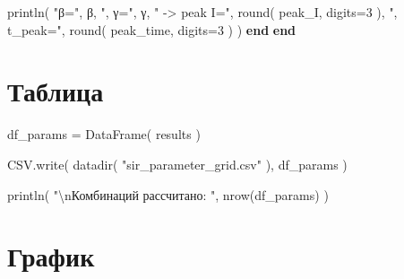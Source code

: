 \documentclass[
  english,
  russian,
  12pt,
  a4paper,
  DIV=11,
  numbers=noendperiod]{scrreprt}
\newenvironment{Shaded}{\begin{snugshade}}{\end{snugshade}}
\newcommand{\ControlFlowTok}[1]{\textcolor[rgb]{0.00,0.23,0.31}{\textbf{#1}}}
\newcommand{\FloatTok}[1]{\textcolor[rgb]{0.68,0.00,0.00}{#1}}
\newcommand{\FunctionTok}[1]{\textcolor[rgb]{0.28,0.35,0.67}{#1}}
\newcommand{\NormalTok}[1]{\textcolor[rgb]{0.00,0.23,0.31}{#1}}
\newcommand{\OperatorTok}[1]{\textcolor[rgb]{0.37,0.37,0.37}{#1}}
\newcommand{\SpecialCharTok}[1]{\textcolor[rgb]{0.37,0.37,0.37}{#1}}
\newcommand{\StringTok}[1]{\textcolor[rgb]{0.13,0.47,0.30}{#1}}
\begin{document}
\begin{Shaded}
\begin{Highlighting}[]
        \FunctionTok{println}\NormalTok{(}
            \StringTok{"β="}\NormalTok{,}
\NormalTok{            β,}
            \StringTok{", γ="}\NormalTok{,}
\NormalTok{            γ,}
            \StringTok{" {-}\textgreater{} peak I="}\NormalTok{,}
            \FunctionTok{round}\NormalTok{(}
\NormalTok{                peak\_I,}
\NormalTok{                digits}\OperatorTok{=}\FloatTok{3}
\NormalTok{            ),}
            \StringTok{", t\_peak="}\NormalTok{,}
            \FunctionTok{round}\NormalTok{(}
\NormalTok{                peak\_time,}
\NormalTok{                digits}\OperatorTok{=}\FloatTok{3}
\NormalTok{            )}
\NormalTok{        )}
    \ControlFlowTok{end}
\ControlFlowTok{end}
\end{Highlighting}
\end{Shaded}

\section{Таблица}\label{ux442ux430ux431ux43bux438ux446ux430}

\begin{Shaded}
\begin{Highlighting}[]
\NormalTok{df\_params }\OperatorTok{=}
    \FunctionTok{DataFrame}\NormalTok{(}
\NormalTok{        results}
\NormalTok{    )}

\NormalTok{CSV.}\FunctionTok{write}\NormalTok{(}
    \FunctionTok{datadir}\NormalTok{(}
        \StringTok{"sir\_parameter\_grid.csv"}
\NormalTok{    ),}
\NormalTok{    df\_params}
\NormalTok{)}

\FunctionTok{println}\NormalTok{(}
    \StringTok{"}\SpecialCharTok{\textbackslash{}n}\StringTok{Комбинаций рассчитано: "}\NormalTok{,}
    \FunctionTok{nrow}\NormalTok{(df\_params)}
\NormalTok{)}
\end{Highlighting}
\end{Shaded}

\section{График}\label{ux433ux440ux430ux444ux438ux43a}
\end{document}
